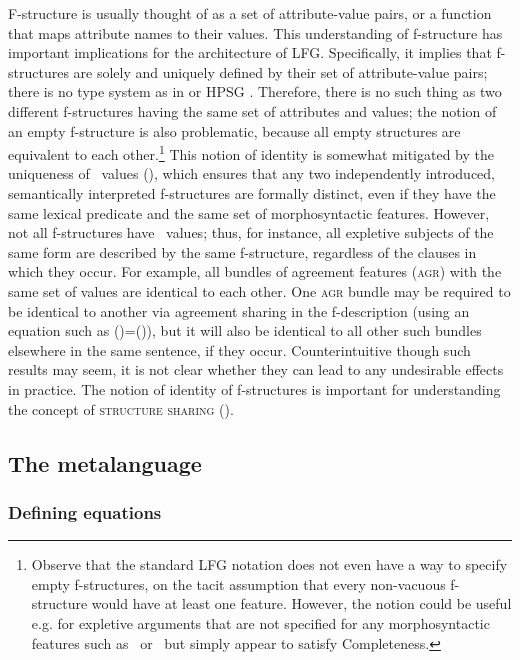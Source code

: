 \documentclass[output=paper,hidelinks]{langscibook}
\begin{document}
F-structure is usually thought of as a set of attribute-value pairs,
or a function that maps attribute names to their values. This
understanding of f-structure has important implications for the
architecture of LFG. Specifically, it implies that f-structures are
solely and uniquely defined by their set of attribute-value pairs;
there is no type system as in \textcite{carpenter1992} or HPSG
\parencite{pollard1994head-driven}. Therefore, there is no such thing
as two different f-structures having the same set of attributes and
values; the notion of an empty f-structure is also problematic,
because all empty structures are equivalent to each
other.\footnote{Observe that the standard LFG notation does not even
have a way to specify empty f-structures, on the tacit assumption that
every non-vacuous f-structure would have at least one feature. However, the notion could be useful e.g. for expletive arguments that are not specified for any morphosyntactic features such as \PERS\ or \CASE\ but simply appear to satisfy Completeness.} This notion of identity is somewhat mitigated by the uniqueness of \PRED\ values (), which ensures that any two independently introduced, semantically interpreted f-structures are formally distinct, even if they have the same lexical predicate and the same set of morphosyntactic features. However, not all f-structures have \PRED\ values; thus, for instance, all expletive subjects of the same form are described by the same f-structure, regardless of the clauses in which they occur. For example, all bundles of agreement features (\textsc{agr}) with the same set of values are identical to each other. One \textsc{agr} bundle may be required to be identical to another via agreement sharing \parencite{haug-nikitina2015} in the f-description (using an equation such as \mbox{(\UP\AGR)=(\UP\SUBJ\AGR)}), but it will also be identical to all other such bundles elsewhere in the same sentence, if they occur. Counterintuitive though such results may seem, it is not clear whether they can lead to any undesirable effects in practice. The notion of identity of f-structures is important for understanding the concept of \textsc{structure sharing} ().  
 
 \subsection{The metalanguage}
 
 \subsubsection{Defining equations}\label{sec:CoreConcepts:Defining}
\end{document}
